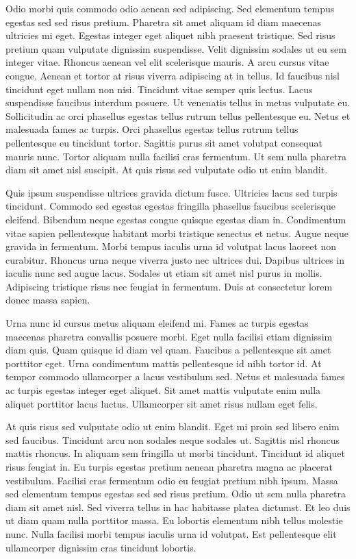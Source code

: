 \documentclass[11pt,a4paper]{article}
\begin{document}
Odio morbi quis commodo odio aenean sed adipiscing. Sed elementum tempus egestas sed sed risus pretium. Pharetra sit amet aliquam id diam maecenas ultricies mi eget. Egestas integer eget aliquet nibh praesent tristique. Sed risus pretium quam vulputate dignissim suspendisse. Velit dignissim sodales ut eu sem integer vitae. Rhoncus aenean vel elit scelerisque mauris. A arcu cursus vitae congue. Aenean et tortor at risus viverra adipiscing at in tellus. Id faucibus nisl tincidunt eget nullam non nisi. Tincidunt vitae semper quis lectus. Lacus suspendisse faucibus interdum posuere. Ut venenatis tellus in metus vulputate eu. Sollicitudin ac orci phasellus egestas tellus rutrum tellus pellentesque eu. Netus et malesuada fames ac turpis. Orci phasellus egestas tellus rutrum tellus pellentesque eu tincidunt tortor. Sagittis purus sit amet volutpat consequat mauris nunc. Tortor aliquam nulla facilisi cras fermentum. Ut sem nulla pharetra diam sit amet nisl suscipit. At quis risus sed vulputate odio ut enim blandit.

Quis ipsum suspendisse ultrices gravida dictum fusce. Ultricies lacus sed turpis tincidunt. Commodo sed egestas egestas fringilla phasellus faucibus scelerisque eleifend. Bibendum neque egestas congue quisque egestas diam in. Condimentum vitae sapien pellentesque habitant morbi tristique senectus et netus. Augue neque gravida in fermentum. Morbi tempus iaculis urna id volutpat lacus laoreet non curabitur. Rhoncus urna neque viverra justo nec ultrices dui. Dapibus ultrices in iaculis nunc sed augue lacus. Sodales ut etiam sit amet nisl purus in mollis. Adipiscing tristique risus nec feugiat in fermentum. Duis at consectetur lorem donec massa sapien.

Urna nunc id cursus metus aliquam eleifend mi. Fames ac turpis egestas maecenas pharetra convallis posuere morbi. Eget nulla facilisi etiam dignissim diam quis. Quam quisque id diam vel quam. Faucibus a pellentesque sit amet porttitor eget. Urna condimentum mattis pellentesque id nibh tortor id. At tempor commodo ullamcorper a lacus vestibulum sed. Netus et malesuada fames ac turpis egestas integer eget aliquet. Sit amet mattis vulputate enim nulla aliquet porttitor lacus luctus. Ullamcorper sit amet risus nullam eget felis.

At quis risus sed vulputate odio ut enim blandit. Eget mi proin sed libero enim sed faucibus. Tincidunt arcu non sodales neque sodales ut. Sagittis nisl rhoncus mattis rhoncus. In aliquam sem fringilla ut morbi tincidunt. Tincidunt id aliquet risus feugiat in. Eu turpis egestas pretium aenean pharetra magna ac placerat vestibulum. Facilisi cras fermentum odio eu feugiat pretium nibh ipsum. Massa sed elementum tempus egestas sed sed risus pretium. Odio ut sem nulla pharetra diam sit amet nisl. Sed viverra tellus in hac habitasse platea dictumst. Et leo duis ut diam quam nulla porttitor massa. Eu lobortis elementum nibh tellus molestie nunc. Nulla facilisi morbi tempus iaculis urna id volutpat. Est pellentesque elit ullamcorper dignissim cras tincidunt lobortis.
\end{document}
